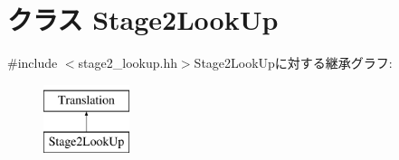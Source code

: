 \hypertarget{classArmISA_1_1Stage2LookUp}{
\section{クラス Stage2LookUp}
\label{classArmISA_1_1Stage2LookUp}
}


{\ttfamily \#include $<$stage2\_\-lookup.hh$>$}Stage2LookUpに対する継承グラフ:\begin{figure}[H]
\begin{center}
\leavevmode
\includegraphics[height=2cm]{classArmISA_1_1Stage2LookUp}
\end{center}
\end{figure}
